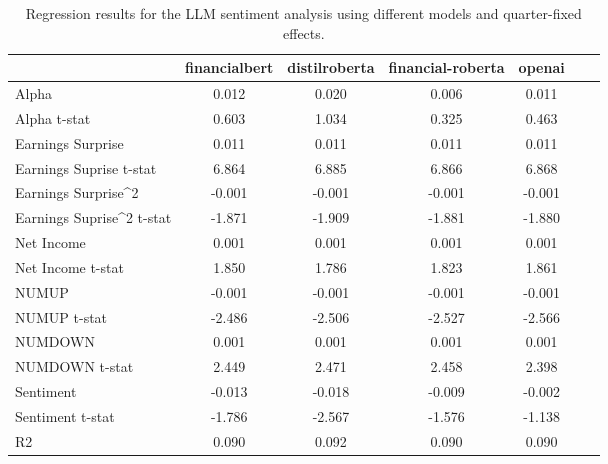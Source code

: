 \begin{table}
\caption{Regression results for the LLM sentiment analysis using different models and quarter-fixed effects.}
\label{tab:llm_regressions_quarter_fixed}
\begin{tabular}{lcccccc}
\toprule
 & financialbert & distilroberta & financial-roberta & openai \\
\midrule
Alpha & 0.012 & 0.020 & 0.006 & 0.011 \\
Alpha t-stat & 0.603 & 1.034 & 0.325 & 0.463 \\
Earnings Surprise & 0.011 & 0.011 & 0.011 & 0.011 \\
Earnings Suprise t-stat & 6.864 & 6.885 & 6.866 & 6.868 \\
Earnings Surprise^2 & -0.001 & -0.001 & -0.001 & -0.001 \\
Earnings Suprise^2 t-stat & -1.871 & -1.909 & -1.881 & -1.880 \\
Net Income & 0.001 & 0.001 & 0.001 & 0.001 \\
Net Income t-stat & 1.850 & 1.786 & 1.823 & 1.861 \\
NUMUP & -0.001 & -0.001 & -0.001 & -0.001 \\
NUMUP t-stat & -2.486 & -2.506 & -2.527 & -2.566 \\
NUMDOWN & 0.001 & 0.001 & 0.001 & 0.001 \\
NUMDOWN t-stat & 2.449 & 2.471 & 2.458 & 2.398 \\
Sentiment & -0.013 & -0.018 & -0.009 & -0.002 \\
Sentiment t-stat & -1.786 & -2.567 & -1.576 & -1.138 \\
R2 & 0.090 & 0.092 & 0.090 & 0.090 \\
\bottomrule
\end{tabular}
\end{table}
